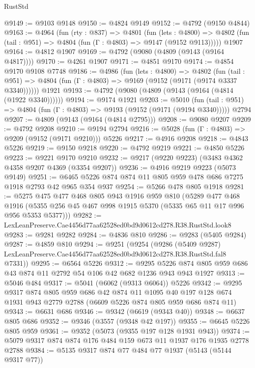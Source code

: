 \begin{lexlean}{RustStd}
\begin{coremodule}
@9149 := @9103 @9148
@9150 := @4824 @9149
@9152 := @4792 (@9150 @4844)
@9163 := @4964
    (fun (rty : @837) =>
    @4801
      (fun (lets : @4800) =>
      @4802 (fun (tail : @951) => @4804 (fun (Γ : @4803) => @9147 (@9152 @9113)))))
    @1907
@9164 := @4812 @1907
@9169 := @4792 (@9080 (@4809 (@9143 (@9164 @4817))))
@9170 := @4261 @1907
@9171 := @4851 @9170
@9174 := @4854 @9170 @9108 @7748
@9186 := @4986
    (fun (lets : @4800) =>
    @4802
      (fun (tail : @951) => @4804 (fun (Γ : @4803) => @9169 (@9152 (@9171 (@9174 @3337 @3340))))))
    @1921
@9193 := @4792 (@9080 (@4809 (@9143 (@9164 (@4814 (@1922 @3340))))))
@9194 := @9174 @1921
@9203 := @5010
    (fun (tail : @951) => @4804 (fun (Γ : @4803) => @9193 (@9152 (@9171 (@9194 @3340)))))
    @2794
@9207 := @4809 (@9143 (@9164 (@4814 @2795)))
@9208 := @9080 @9207
@9209 := @4792 @9208
@9210 := @9194 @2794
@9216 := @5028 (fun (Γ : @4803) => @9209 (@9152 (@9171 @9210))) @5226
@9217 := @4916 @9208
@9218 := @4843 @5226
@9219 := @9150 @9218
@9220 := @4792 @9219
@9221 := @4850 @5226
@9223 := @9221 @9170 @9210
@9232 := @9217 (@9220 @9223) (@3483 @4362 @4358 @9207 @4369 (@3354 @9207))
@9236 := @4916 @9219 @9223 (@5073 @9149)
@9251 := @6465 @5226 @874 @874 @11 @805 @959 @478 @686 @7275 @1918 @2793 @42 @965 @354 @937
@9254 := @5266 @478 @805 @1918
@9281 := @5275
    @475
    @477
    @468
    @805
    @943
    @1916
    @959
    @810
    (@5289
      @477
      @468
      @1916
      (@5355 @256 @45 @467 @998 @1915 @5370 (@5335 @65 @11 @17 @996 @956 @5353 @5377)))
@9282 := LexLeanPreserve.Cae4456d77aa62528ed0bd9d0612cd278.R38.RustStd.look8
@9283 := @9281 @9282
@9284 := @4836 @810
@9286 := @9283 (@5405 @9284)
@9287 := @4859 @810
@9294 := @9251
    (@9254
      (@9286
        (@5409 @9287)
        LexLeanPreserve.Cae4456d77aa62528ed0bd9d0612cd278.R38.RustStd.fal8
        @7331))
@9295 := @6564 @5226
@9312 := @9295 @5226 @874 @805 @959 @686 @43 @874 @11 @2792 @54 @106 @42 @682 @1236 @943 @943 @1927
@9313 := @5046 @484
@9317 := @5041 (@6062 (@9313 @6064)) @5226
@9342 := @9295
    @9317
    @874
    @805
    @959
    @686
    @42
    @874
    @11
    @1095
    @40
    @197
    @128
    @674
    @1931
    @943
    @2779
    @2788
    (@6609 @5226 @874 @805 @959 @686 @874 @11)
@9343 := @6631 @686
@9346 := @9342 (@6619 (@9343 @40))
@9348 := @6637 @805 @686
@9352 := @9346 (@3557 (@9348 @42 @197))
@9355 := @6645 @5226 @805 @959
@9361 := @9352 (@5073 (@9355 @197 @128 @1931 @943))
@9374 := @5079 @9317 @874 @874 @176 @484 @159 @673 @11 @1937 @176 @1935 @2778 @2788
@9384 := @5135 @9317 @874 @77 @484 @77 @1937 (@5143 (@5144 @9317 @77))

\end{coremodule}
\end{lexlean}
